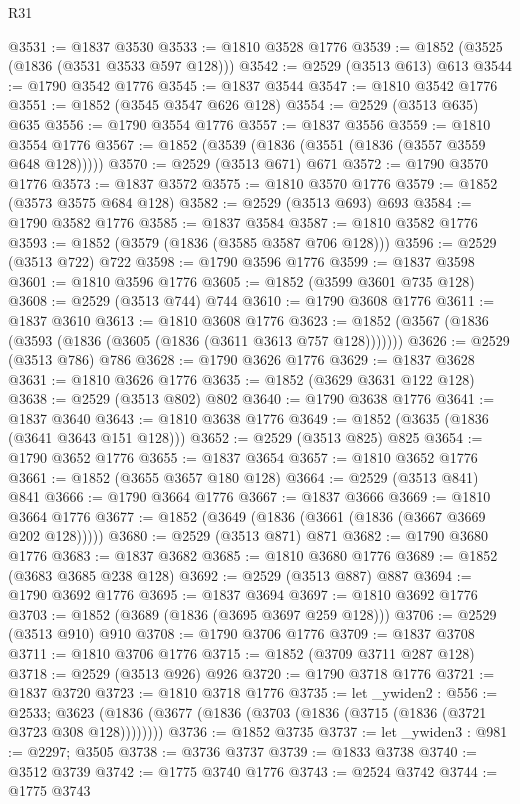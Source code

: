 \begin{lexlean}{R31}
\begin{coremodule}
@3531 := @1837 @3530
@3533 := @1810 @3528 @1776
@3539 := @1852 (@3525 (@1836 (@3531 @3533 @597 @128)))
@3542 := @2529 (@3513 @613) @613
@3544 := @1790 @3542 @1776
@3545 := @1837 @3544
@3547 := @1810 @3542 @1776
@3551 := @1852 (@3545 @3547 @626 @128)
@3554 := @2529 (@3513 @635) @635
@3556 := @1790 @3554 @1776
@3557 := @1837 @3556
@3559 := @1810 @3554 @1776
@3567 := @1852 (@3539 (@1836 (@3551 (@1836 (@3557 @3559 @648 @128)))))
@3570 := @2529 (@3513 @671) @671
@3572 := @1790 @3570 @1776
@3573 := @1837 @3572
@3575 := @1810 @3570 @1776
@3579 := @1852 (@3573 @3575 @684 @128)
@3582 := @2529 (@3513 @693) @693
@3584 := @1790 @3582 @1776
@3585 := @1837 @3584
@3587 := @1810 @3582 @1776
@3593 := @1852 (@3579 (@1836 (@3585 @3587 @706 @128)))
@3596 := @2529 (@3513 @722) @722
@3598 := @1790 @3596 @1776
@3599 := @1837 @3598
@3601 := @1810 @3596 @1776
@3605 := @1852 (@3599 @3601 @735 @128)
@3608 := @2529 (@3513 @744) @744
@3610 := @1790 @3608 @1776
@3611 := @1837 @3610
@3613 := @1810 @3608 @1776
@3623 := @1852 (@3567 (@1836 (@3593 (@1836 (@3605 (@1836 (@3611 @3613 @757 @128)))))))
@3626 := @2529 (@3513 @786) @786
@3628 := @1790 @3626 @1776
@3629 := @1837 @3628
@3631 := @1810 @3626 @1776
@3635 := @1852 (@3629 @3631 @122 @128)
@3638 := @2529 (@3513 @802) @802
@3640 := @1790 @3638 @1776
@3641 := @1837 @3640
@3643 := @1810 @3638 @1776
@3649 := @1852 (@3635 (@1836 (@3641 @3643 @151 @128)))
@3652 := @2529 (@3513 @825) @825
@3654 := @1790 @3652 @1776
@3655 := @1837 @3654
@3657 := @1810 @3652 @1776
@3661 := @1852 (@3655 @3657 @180 @128)
@3664 := @2529 (@3513 @841) @841
@3666 := @1790 @3664 @1776
@3667 := @1837 @3666
@3669 := @1810 @3664 @1776
@3677 := @1852 (@3649 (@1836 (@3661 (@1836 (@3667 @3669 @202 @128)))))
@3680 := @2529 (@3513 @871) @871
@3682 := @1790 @3680 @1776
@3683 := @1837 @3682
@3685 := @1810 @3680 @1776
@3689 := @1852 (@3683 @3685 @238 @128)
@3692 := @2529 (@3513 @887) @887
@3694 := @1790 @3692 @1776
@3695 := @1837 @3694
@3697 := @1810 @3692 @1776
@3703 := @1852 (@3689 (@1836 (@3695 @3697 @259 @128)))
@3706 := @2529 (@3513 @910) @910
@3708 := @1790 @3706 @1776
@3709 := @1837 @3708
@3711 := @1810 @3706 @1776
@3715 := @1852 (@3709 @3711 @287 @128)
@3718 := @2529 (@3513 @926) @926
@3720 := @1790 @3718 @1776
@3721 := @1837 @3720
@3723 := @1810 @3718 @1776
@3735 := let _ywiden2 : @556 := @2533;
  @3623 (@1836 (@3677 (@1836 (@3703 (@1836 (@3715 (@1836 (@3721 @3723 @308 @128))))))))
@3736 := @1852 @3735
@3737 := let _ywiden3 : @981 := @2297; @3505
@3738 := @3736 @3737
@3739 := @1833 @3738
@3740 := @3512 @3739
@3742 := @1775 @3740 @1776
@3743 := @2524 @3742
@3744 := @1775 @3743

\end{coremodule}
\end{lexlean}
